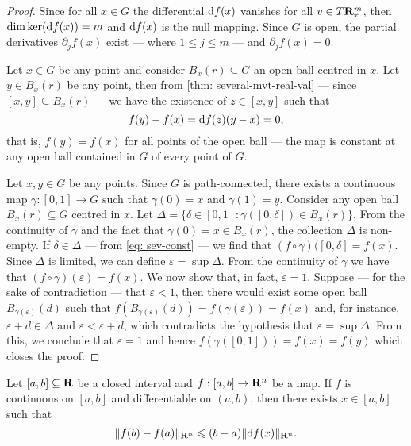 \begin{proof}
    Since for all \(x \in G\) the differential \(\mathrm{d} f(x)\) vanishes for all \(v
    \in T\mathbf{R}^m_x\), then \(\dim \ker(\mathrm{d} f(x)) = m\) and \(\mathrm{d} f(x)\) is the
    null mapping. Since \(G\) is open, the partial derivatives \(\partial_j f(x)\)
    exist --- where \(1 \leq j \leq m\) --- and \(\partial_j f(x) = 0\).

    Let \(x \in G\) be any point and consider \(B_x(r) \subseteq G\) an open ball
    centred in \(x\). Let \(y \in B_x(r)\) be any point, then from \cref{thm:
        several-mvt-real-val} --- since \([x, y] \subseteq B_x(r)\) --- we have the
    existence of \(z \in [x, y]\) such that
    \begin{equation}\label{eq: sev-const}
        f(y) - f(x) = \mathrm{d} f(z)(y - x) = 0,
    \end{equation}
    that is, \(f(y) = f(x)\) for all points of the open ball --- the map is
    constant at any open ball contained in \(G\) of every point of \(G\).

    Let \(x, y \in G\) be any points. Since \(G\) is path-connected, there exists
    a continuous map \(\gamma: [0, 1] \to G\) such that \(\gamma(0) = x\) and
    \(\gamma(1) = y\). Consider any open ball \(B_x(r) \subseteq G\) centred in
    \(x\). Let \(\Delta = \{\delta \in [0, 1] \colon \gamma([0, \delta]) \in
    B_x(r)\}\). From the continuity of \(\gamma\) and the fact that \(\gamma(0) =
    x \in B_x(r)\), the collection \(\Delta\) is non-empty. If \(\delta \in
    \Delta\) --- from \cref{eq: sev-const} --- we find that \((f \circ \gamma)([0,
            \delta] = f(x)\). Since \(\Delta\) is limited, we can define \(\varepsilon =
    \sup \Delta\). From the continuity of \(\gamma\) we have that \((f \circ
    \gamma)(\varepsilon) = f(x)\). We now show that, in fact, \(\varepsilon = 1\).
    Suppose --- for the sake of contradiction --- that \(\varepsilon < 1\), then
    there would exist some open ball \(B_{\gamma(\varepsilon)}(d)\) such that
    \(f(B_{\gamma(\varepsilon)}(d)) = f(\gamma(\varepsilon)) = f(x)\) and, for
    instance, \(\varepsilon + d \in \Delta\) and \(\varepsilon < \varepsilon +
    d\), which contradicts the hypothesis that \(\varepsilon = \sup \Delta\). From
    this, we conclude that \(\varepsilon = 1\) and hence \(f(\gamma([0, 1])) = f(x)
    = f(y)\) which closes the proof.
\end{proof}

\begin{lemma}\label{lem: mvt-sev-real-dom}
    Let \([a, b] \subseteq \mathbf{R}\) be a closed interval and \(f: [a, b] \to \mathbf{R}^n\) be
    a map. If \(f\) is continuous on \([a, b]\) and differentiable on \((a, b)\),
    then there exists \(x \in [a, b]\) such that
    \[
        \lVert f(b) - f(a)\rVert_{\mathbf{R}^n} \leqslant (b - a) \lVert\mathrm{d} f(x)\rVert_{\mathbf{R}^n}.
    \]
\end{lemma}

